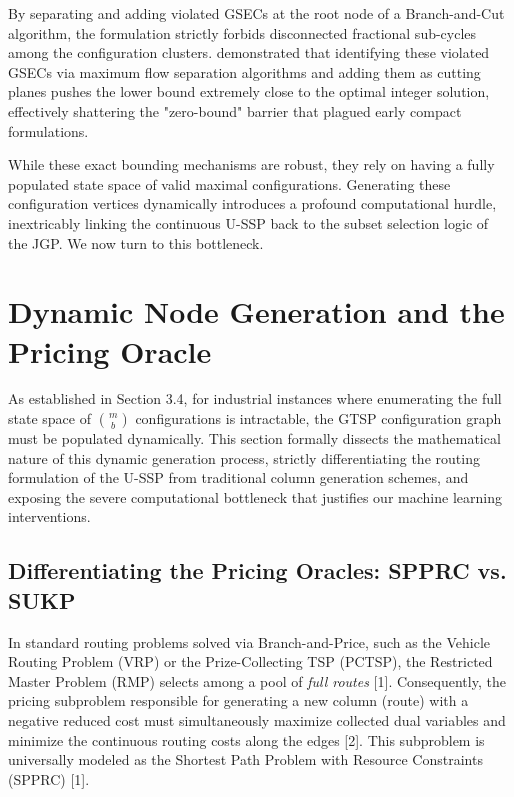\documentclass[12pt]{article}
\begin{document}
By separating and adding violated GSECs at the root node of a Branch-and-Cut algorithm, the formulation strictly forbids disconnected fractional sub-cycles among the configuration clusters. \cite{Fischetti1997} demonstrated that identifying these violated GSECs via maximum flow separation algorithms and adding them as cutting planes pushes the lower bound extremely close to the optimal integer solution, effectively shattering the "zero-bound" barrier that plagued early compact formulations.

While these exact bounding mechanisms are robust, they rely on having a fully populated state space of valid maximal configurations. Generating these configuration vertices dynamically introduces a profound computational hurdle, inextricably linking the continuous U-SSP back to the subset selection logic of the JGP. We now turn to this bottleneck.

\section{Dynamic Node Generation and the Pricing Oracle}
\label{sec:pricing_oracle}

As established in Section 3.4, for industrial instances where enumerating the full state space of $\binom{m}{b}$ configurations is intractable, the GTSP configuration graph must be populated dynamically. This section formally dissects the mathematical nature of this dynamic generation process, strictly differentiating the routing formulation of the U-SSP from traditional column generation schemes, and exposing the severe computational bottleneck that justifies our machine learning interventions.

\subsection{Differentiating the Pricing Oracles: SPPRC vs. SUKP}

In standard routing problems solved via Branch-and-Price, such as the Vehicle Routing Problem (VRP) or the Prize-Collecting TSP (PCTSP), the Restricted Master Problem (RMP) selects among a pool of \textit{full routes} \cite{Barnhart1998} [1]. Consequently, the pricing subproblem responsible for generating a new column (route) with a negative reduced cost must simultaneously maximize collected dual variables and minimize the continuous routing costs along the edges [2]. This subproblem is universally modeled as the Shortest Path Problem with Resource Constraints (SPPRC) [1].
\end{document}
